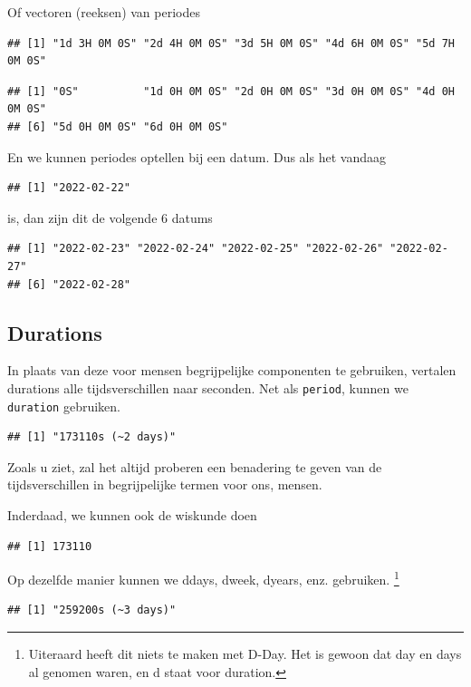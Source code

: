\documentclass[]{tufte-book}
\begin{document}
Of vectoren (reeksen) van periodes

\begin{verbatim}
## [1] "1d 3H 0M 0S" "2d 4H 0M 0S" "3d 5H 0M 0S" "4d 6H 0M 0S" "5d 7H 0M 0S"
\end{verbatim}

\begin{verbatim}
## [1] "0S"          "1d 0H 0M 0S" "2d 0H 0M 0S" "3d 0H 0M 0S" "4d 0H 0M 0S"
## [6] "5d 0H 0M 0S" "6d 0H 0M 0S"
\end{verbatim}

En we kunnen periodes optellen bij een datum. Dus als het vandaag

\begin{verbatim}
## [1] "2022-02-22"
\end{verbatim}

is, dan zijn dit de volgende 6 datums

\begin{verbatim}
## [1] "2022-02-23" "2022-02-24" "2022-02-25" "2022-02-26" "2022-02-27"
## [6] "2022-02-28"
\end{verbatim}

\hypertarget{durations}{%
\subsection{Durations}\label{durations}}

In plaats van deze voor mensen begrijpelijke componenten te gebruiken, vertalen durations alle tijdsverschillen naar seconden. Net als \texttt{period}, kunnen we \texttt{duration} gebruiken.

\begin{verbatim}
## [1] "173110s (~2 days)"
\end{verbatim}

Zoals u ziet, zal het altijd proberen een benadering te geven van de tijdsverschillen in begrijpelijke termen voor ons, mensen.

Inderdaad, we kunnen ook de wiskunde doen

\begin{verbatim}
## [1] 173110
\end{verbatim}

Op dezelfde manier kunnen we ddays, dweek, dyears, enz. gebruiken. \footnote{Uiteraard heeft dit niets te maken met D-Day. Het is gewoon dat day en days al genomen waren, en d staat voor duration.}

\begin{verbatim}
## [1] "259200s (~3 days)"
\end{verbatim}
\end{document}
